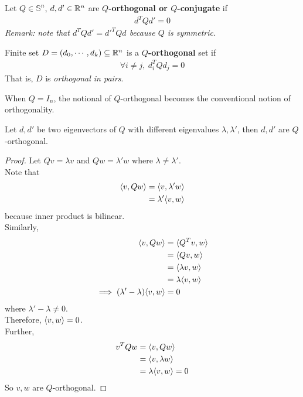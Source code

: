 \documentclass{article}
\begin{document}
	\begin{definition}
		Let $Q \in \mathbb{S}^n$, $d, d' \in \mathbb{R}^n$ are \textbf{$Q$-orthogonal or $Q$-conjugate} if 
		\begin{align}
			d^T Q d' = 0
		\end{align}
		\emph{Remark: note that $d^T Q d' = d'^T Q d$ because $Q$ is symmetric.}
	\end{definition}
	
	\begin{definition}
		Finite set $D = (d_0, \cdots, d_k) \subseteq \mathbb{R}^n$ is a \textbf{$Q$-orthogonal} set if
		\begin{align}
			\forall i \neq j,\ d_i^T Q d_j = 0
		\end{align}
		That is, $D$ is \emph{orthogonal in pairs}.
	\end{definition}
	
	\begin{example}
		When $Q = I_n$, the notional of $Q$-orthogonal becomes the conventional notion of orthogonality.
	\end{example}
	
	\begin{proposition}
		Let $d, d'$ be two eigenvectors of $Q$ with different eigenvalues $\lambda, \lambda'$, then $d, d'$ are $Q$-orthogonal.
	\end{proposition}
	
	\begin{proof}
		Let $Q v = \lambda v$ and $Q w = \lambda' w$ where $\lambda \neq \lambda'$. \\
		Note that 
		\begin{align}
			\langle {v}, {Qw} \rangle &= \langle {v}, {\lambda' w} \rangle \\
			&= \lambda' \langle {v}, {w} \rangle
		\end{align}
		because inner product is bilinear. \\
		Similarly,
		\begin{align}
			\langle {v}, {Qw} \rangle &= \langle {Q^T v}, {w} \rangle \\
			&= \langle {Q v}, {w} \rangle \\
			&= \langle {\lambda v}, {w} \rangle \\
			&= \lambda \langle {v}, {w} \rangle\\
			\implies (\lambda'  - \lambda) \langle {v}, {w} \rangle &= 0
		\end{align}
		where $\lambda'  - \lambda \neq 0$. \\
		Therefore, $\langle {v}, {w} \rangle = 0$. \\
		Further, 
		\begin{align}
			v^T Q w &= \langle {v}, {Qw} \rangle \\
			&= \langle {v}, {\lambda w} \rangle \\
			&= \lambda \langle {v}, {w} \rangle = 0
		\end{align}
		So $v, w$ are $Q$-orthogonal.
	\end{proof}
	
\end{document}
